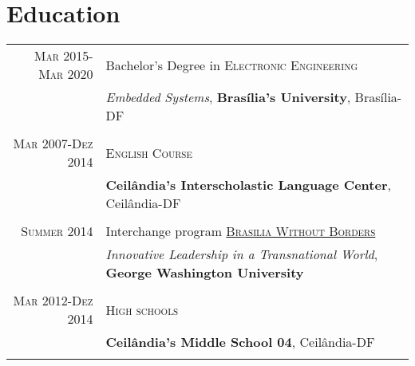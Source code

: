 \documentclass[a4paper,10pt]{article} %
\begin{document}
\section{Education}

\begin{tabular}{rl}	


\textsc{Mar} 2015-\textsc{Mar} 2020& Bachelor's Degree in \textsc{}\textsc{Electronic Engineering}\\
& \small\emph{Embedded Systems}, \normalsize\textbf{Brasília's University}, Brasília-DF\\
&\\


\textsc{Mar} 2007-\textsc{Dez} 2014&\textsc{}\textsc{English Course}\\
& \normalsize\textbf{Ceilândia's Interscholastic Language Center}, Ceilândia-DF\\
&\\


\textsc{Summer} 2014 & Interchange program \textsc{}\textsc{\href{https://summer.gwu.edu/brasilia-without-borders}{Brasilia Without Borders}}\\
& \small\emph{Innovative Leadership in a Transnational World}, \normalsize\textbf{George Washington University}\\
&\\

\textsc{Mar} 2012-\textsc{Dez} 2014&  \textsc{}\textsc{High schools}\\
& \small\emph{}\normalsize\textbf{Ceilândia's Middle School 04},  Ceilândia-DF\\
&\\

\end{tabular}


\end{document}

